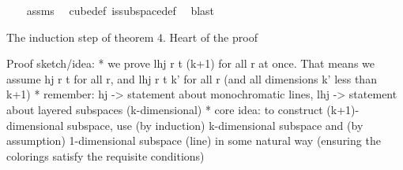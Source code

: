 \begin{isabellebody}
%
\isadelimproof
\ \ %
\endisadelimproof
%
\isatagproof
{}\isamarkupfalse%
\ assms\ \isamarkupfalse%
\ cube{\isacharunderscore}{\kern0pt}def\ is{\isacharunderscore}{\kern0pt}subspace{\isacharunderscore}{\kern0pt}def\ \isamarkupfalse%
\ blast%
\endisatagproof
{\isafoldproof}%
%
\isadelimproof
%
\endisadelimproof
%
\begin{isamarkuptext}%
The induction step of theorem 4. Heart of the proof%
\end{isamarkuptext}\isamarkuptrue%
%
\begin{isamarkuptext}%
Proof sketch/idea:
  * we prove lhj r t (k+1) for all r at once. That means we assume hj r t for all r, and lhj r t k' for all r (and all dimensions k' less than k+1)
  * remember: hj -> statement about monochromatic lines, lhj -> statement about layered subspaces (k-dimensional)
  * core idea: to construct (k+1)-dimensional subspace, use (by induction) k-dimensional subspace and (by assumption) 1-dimensional subspace (line) in some natural way (ensuring the colorings satisfy the requisite conditions)


\end{isamarkuptext}
\end{isabellebody}
